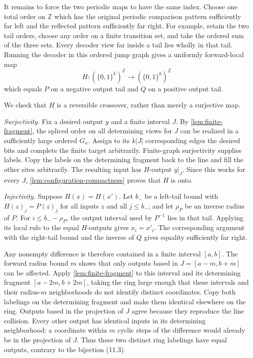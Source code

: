 \documentclass[11pt]{article}
\theoremstyle{definition}
\theoremstyle{remark}
\newcommand{\bits}{\{0,1\}}
\begin{document}
It remains to force the two periodic maps to have the same index.  Choose one
total order on $\mathbb Z$ which has the original periodic comparison pattern
sufficiently far left and the reflected pattern sufficiently far right.  For
example, retain the two tail orders, choose any order on a finite transition
set, and take the ordered sum of the three sets.  Every decoder view far
inside a tail lies wholly in that tail.  Running the decoder in this ordered
jump graph gives a uniformly forward-local map
\[
                         H:(\bits^k)^{\mathbb Z}
                           \longrightarrow(\bits^k)^{\mathbb Z}
\]
which equals $P$ on a negative output tail and $Q$ on a positive output tail.

We check that $H$ is a reversible crossover, rather than merely a surjective
map.

\emph{Surjectivity.}  Fix a desired output $y$ and a finite interval
$J$.  By \cref{lem:finite-fragment}, the spliced order on all determining
views for $J$ can be realized in a sufficiently large ordered $G_n$.
Assign to its $k|J|$ corresponding edges the desired bits and complete
the finite target arbitrarily.  Finite-graph surjectivity supplies labels.
Copy the labels on the determining fragment back to the line and fill
the other sites arbitrarily.  The resulting input has $H$-output
$y|_J$.  Since this works for every $J$,
\cref{lem:configuration-compactness} proves that $H$ is onto.

\emph{Injectivity.}  Suppose $H(x)=H(x')$.  Let $b_-$ be a left-tail
bound with $H(z)_j=P(z)_j$ for all inputs $z$ and all $j\le b_-$,
and let $\rho_P$ be an inverse radius of $P$.  For
$i\le b_--\rho_P$, the output interval used by $P^{-1}$ lies in
that tail.  Applying its local rule to the equal $H$-outputs gives
$x_i=x'_i$.  The corresponding argument with the right-tail bound
and the inverse of $Q$ gives equality sufficiently far right.

Any nonempty difference is therefore contained in a finite interval
$[a,b]$.  The forward radius bound $m$ shows that only outputs based
in $J=[a-m,b+m]$ can be affected.  Apply
\cref{lem:finite-fragment} to this interval and its determining fragment
$[a-2m,b+2m]$, taking the ring large enough that these intervals and their
radius-$m$ neighborhoods do not identify distinct coordinates.
Copy both labelings on the determining fragment and make them identical
elsewhere on the ring.  Outputs based in the projection of $J$ agree
because they reproduce the line collision.  Every other output has
identical inputs in its determining neighborhood: a coordinate within
$m$ cyclic steps of the difference would already be in the projection
of $J$.  Thus these two distinct ring labelings have equal outputs,
contrary to the bijection (11.3).
\end{document}
